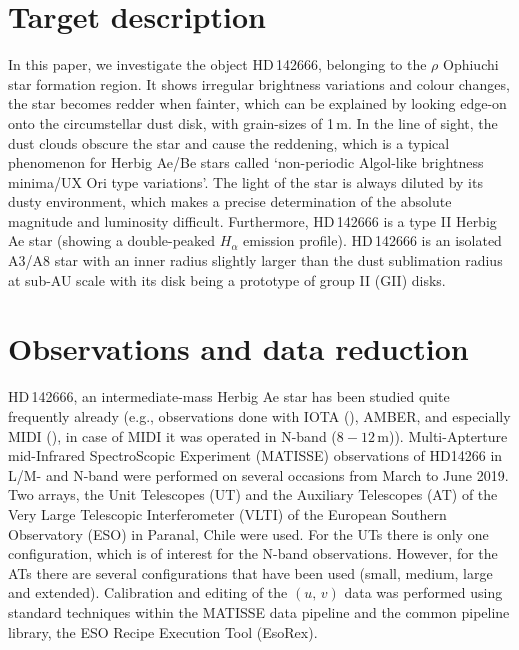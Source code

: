 \documentclass{aa}
\newcommand{\m}{\textmu}
\newcommand{\umum}{\,\m$\mathrm{m}$}
\begin{document}
\section{Target description}
In this paper, we investigate the object HD\,142666, belonging to the $\rho$
Ophiuchi star formation region\citet{Schegerer2013}. It shows
irregular brightness variations and colour changes, the star becomes redder when
fainter, which can be explained by looking edge-on onto the circumstellar dust
disk, with grain-sizes of 1\umum. In the line of sight, the dust clouds obscure
the star and cause the reddening, which is a typical phenomenon for Herbig
Ae/Be stars called `non-periodic Algol-like brightness minima/UX Ori type
variations'. The light of the star is always diluted by its dusty
environment, which makes a precise determination of the absolute magnitude and
luminosity difficult. Furthermore, HD\,142666 is a type II Herbig Ae star
(showing a double-peaked $H_{\alpha}$ emission profile)\citet{Zwintz2008}.
HD\,142666 is an isolated A3/A8 star with an inner radius slightly larger than
the dust sublimation radius at sub-AU scale with its disk being a prototype of group II (GII)
disks\citet{Garufi2017}.
\section{Observations and data reduction}
HD\,142666, an intermediate-mass Herbig Ae star has been studied quite frequently already
(e.g., observations done with IOTA (), AMBER, and especially MIDI (), in case
of MIDI it was operated in N-band ($8-12$\umum)\citet{Schegerer2013}).
Multi-Apterture mid-Infrared SpectroScopic Experiment (MATISSE) observations of
HD14266 in L/M- and N-band were performed on several occasions from March to June 2019.
Two arrays, the Unit Telescopes (UT) and the Auxiliary Telescopes (AT) of the Very Large Telescopic Interferometer (VLTI) of the European Southern Observatory (ESO) in Paranal, Chile were used.
For the UTs there is only one configuration, which is of interest for the N-band observations.
However, for the ATs there are several configurations that have been used (small, medium, large and extended).
Calibration and editing of the $\left(\textit{u, v}\right)$ data was performed using standard techniques within the MATISSE data pipeline and the common pipeline library, the ESO Recipe Execution Tool (EsoRex).
\end{document}
